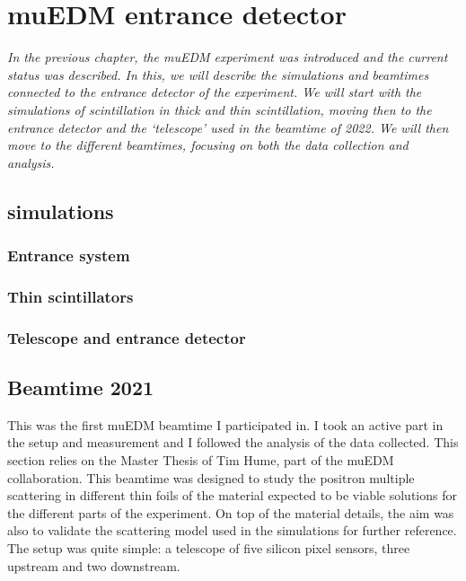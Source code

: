 \chapter{muEDM entrance detector}
\label{ch:muEDM:entrance}
\begin{refsection}

{\itshape
In the previous chapter, the muEDM experiment was introduced and the current status was described.
In this, we will describe the simulations and beamtimes connected to the entrance detector of the experiment. 
We will start with the \gf simulations of scintillation in thick and thin scintillation, moving then to the entrance detector and the `telescope' used in the beamtime of 2022.
We will then move to the different beamtimes, focusing on both the data collection and analysis.
}

\section{\gf simulations}
    \label{sec:muEDM:entrance:sim}
    \subsection{Entrance system}
    \subsection{Thin scintillators}
    \subsection{Telescope and entrance detector}

\section{Beamtime 2021}
    This was the first muEDM beamtime I participated in. 
    I took an active part in the setup and measurement and I followed the analysis of the data collected. 
    This section relies on the Master Thesis of Tim Hume, part of the muEDM collaboration.
    This beamtime was designed to study the positron multiple scattering in different thin foils of the material expected to be viable solutions for the different parts of the experiment.
    On top of the material details, the aim was also to validate the scattering model used in the \gf simulations for further reference.
    The setup was quite simple: a telescope of five silicon pixel sensors,  three upstream and two downstream.


\end{refsection}
